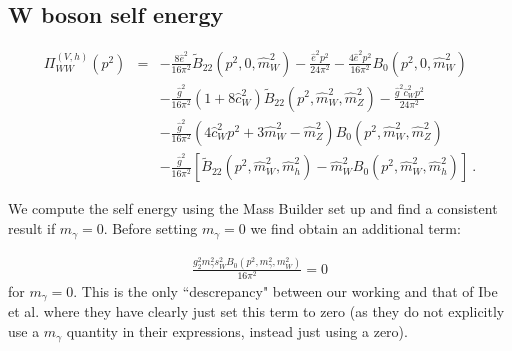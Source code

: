 \documentclass[11pt]{article}
\begin{document}
\subsection{W boson self energy}


{\small
\begin{eqnarray}
\Pi_{WW}^{(V, h)}(p^2) &=&
-\frac{8\hat{e}^2}{16\pi^2} \tilde B_{22}(p^2, 0, \hat{m}_W^2)
-\frac{\hat{e}^2 p^2}{24\pi^2}
-\frac{4\hat{e}^2 p^2}{16\pi^2} B_0(p^2, 0, \hat{m}_W^2) \nonumber \\
&& -\frac{\hat{g}^2}{16\pi^2}(1 + 8\hat{c}_W^2)
\tilde{B}_{22}(p^2, \hat{m}_W^2, \hat{m}_Z^2)
-\frac{\hat{g}^2 \hat{c}_W^2 p^2}{24\pi^2} \nonumber \\
&& -\frac{\hat g^2}{16\pi^2}( 4 \hat c_W^2 p^2 + 3 \hat m_W^2 - \hat m_Z^2) B_0( p^2, \hat m_W^2, \hat m_Z^2) \nonumber\\
&& -\frac{\hat{g}^2}{16\pi^2}
[ \tilde{B}_{22}(p^2, \hat{m}_W^2, \hat{m}_h^2)
-\hat{m}_W^2 B_0(p^2, \hat{m}_W^2, \hat{m}_h^2) ]\ .\label{eq:vhloop2}
\end{eqnarray}
}

We compute the self energy using the Mass Builder set up and find a consistent result if $m_{\gamma}=0$.  Before setting $m_{\gamma}=0$ we find obtain an additional term:

\begin{align}
\frac{g_2^2 m_{\gamma}^2 s_W^2 B_0(p^2,m_{\gamma}^2,m_W^2)}{16 \pi^2} = 0
\end{align}
for $m_{\gamma}=0$.  This is the only ``descrepancy" between our working and that of Ibe et al. where they have clearly just set this term to zero (as they do not explicitly use a  $m_{\gamma}$ quantity in their expressions, instead just using a zero).
\end{document}
